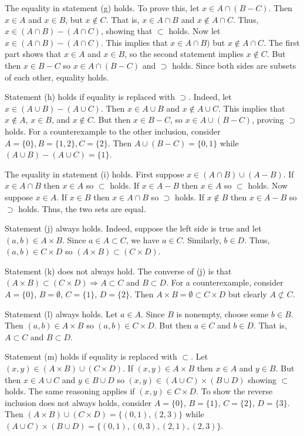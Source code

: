 \documentclass[../../master.tex]{subfiles}
\begin{document}
\begin{solution}
    The equality in statement (g) holds.
    To prove this, let $x \in A \cap (B - C)$.
    Then $x \in A$ and $x \in B$, but $x \notin C$.
    That is, $x \in A \cap B$ and $x \notin A \cap C$.
    Thus, $x \in (A \cap B) - (A \cap C)$, showing that $\subset$ holds.
    Now let $x \in (A \cap B) - (A \cap C)$.
    This implies that $x \in A \cap B)$ but $x \notin A \cap C$.
    The first part shows that $x \in A$ and $x \in B$, so the second statement implies $x \notin C$.
    But then $x \in B - C$ so $x \in A \cap (B - C)$ and $\supset$ holds.
    Since both sides are subsets of each other, equality holds.

    Statement (h) holds if equality is replaced with $\supset$. 
    Indeed, let $x \in (A \cup B) - (A \cup C)$.
    Then $x \in A \cup B$ and $x \notin A \cup C$.
    This implies that $x \notin A$, $x \in B$, and $x \notin C$.
    But then $x \in B - C$, so $x \in A \cup (B - C)$, proving $\supset$ holds.
    For a counterexample to the other inclusion, consider $A = \{0\}, B = \{1, 2\}, C = \{2\}$.
    Then $A \cup (B - C) = \{0, 1\}$ while $(A \cup B) - (A \cup C) = \{1\}$.

    The equality in statement (i) holds. 
    First suppose $x \in (A \cap B) \cup (A - B)$.
    If $x \in A \cap B$ then $x \in A$ so  $\subset$ holds.
    If $x \in A - B$ then $x \in A$ so $\subset$ holds.
    Now suppose $x \in A$.
    If $x \in B$ then $x \in A \cap B$ so $\supset$ holds.
    If $x \notin B$ then $x \in A - B$ so $\supset$ holds.
    Thus, the two sets are equal.

    Statement (j) always holds.
    Indeed, suppose the left side is true and let $(a, b) \in A \times B$.
    Since $a \in A \subset C$, we have $a \in C$. 
    Similarly, $b \in D$.
    Thus, $(a, b) \in C \times D$ so $(A \times B) \subset (C \times D)$.

    Statement (k) does not always hold.
    The converse of (j) is that $(A \times B) \subset (C \times D) \Rightarrow A \subset C$ and $B \subset D$.
    For a counterexample, consider $A = \{0\}$, $B = \emptyset$, $C = \{1\}$, $D = \{2\}$.
    Then $A \times B = \emptyset \subset C \times D$ but clearly  $A \not\subset C$.

    Statement (l) always holds. 
    Let $a \in A$. Since $B$ is nonempty, choose some $b \in B$. 
    Then $(a, b) \in A \times B$ so $(a, b) \in C \times D$.
    But then $a \in C$ and $b \in D$.
    That is, $A \subset C$ and $B \subset D$.

    Statement (m) holds if equality is replaced with $\subset$.
    Let $(x, y) \in (A \times B) \cup (C \times D)$.
    If $(x, y) \in A \times B$ then $x \in A$ and $y \in B$.
    But then $x \in A \cup C$ and $y \in B \cup D$ so $(x, y) \in (A \cup C) \times (B \cup D)$ showing $\subset$ holds.
    The same reasoning applies if $(x, y) \in C \times D$.
    To show the reverse inclusion does not always holds, consider $A = \{0\}$, $B = \{1\}$, $C = \{2\}$, $D = \{3\}$.
    Then $(A \times B) \cup (C \times D) = \{(0, 1), (2, 3)\}$ while $(A \cup C) \times (B \cup D) = \{(0, 1), (0, 3), (2, 1), (2, 3)\}$.


\end{solution}
\end{document}

